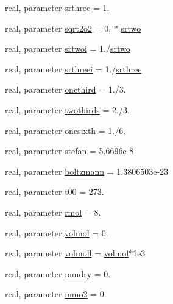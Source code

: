 \begin{DoxyCompactItemize}
\item 
real, parameter \hyperlink{namespaceconsts__coms_a17913c8f0ccea4623bad63371995c51f}{srthree} = 1.
\item 
real, parameter \hyperlink{namespaceconsts__coms_a21cd110a4618508e5aabb43b56aa56d6}{sqrt2o2} = 0. $\ast$ \hyperlink{namespaceconsts__coms_ad2093037aef885081f727f22fe6b2554}{srtwo}
\item 
real, parameter \hyperlink{namespaceconsts__coms_a1dbb872d0aae3243d72b9c43864ec88f}{srtwoi} = 1./\hyperlink{namespaceconsts__coms_ad2093037aef885081f727f22fe6b2554}{srtwo}
\item 
real, parameter \hyperlink{namespaceconsts__coms_a448722d61ca70f7d3d572048be47c1e5}{srthreei} = 1./\hyperlink{namespaceconsts__coms_a17913c8f0ccea4623bad63371995c51f}{srthree}
\item 
real, parameter \hyperlink{namespaceconsts__coms_a77951232affbc4dc54bd20a0dfe1244f}{onethird} = 1./3.
\item 
real, parameter \hyperlink{namespaceconsts__coms_a7ac856e6d8ab0454fcd39dce6cd2ea71}{twothirds} = 2./3.
\item 
real, parameter \hyperlink{namespaceconsts__coms_ada6e5b6811f533bff45549fe556966ee}{onesixth} = 1./6.
\item 
real, parameter \hyperlink{namespaceconsts__coms_af216e24a2bb718d85f4e5501f586634e}{stefan} = 5.\+6696e-\/8
\item 
real, parameter \hyperlink{namespaceconsts__coms_afc5519d22399e9054c914e08f4b03bc5}{boltzmann} = 1.\+3806503e-\/23
\item 
real, parameter \hyperlink{namespaceconsts__coms_afbc98a1338166b05d3a2d997c7b27259}{t00} = 273.
\item 
real, parameter \hyperlink{namespaceconsts__coms_ada5d8a1334128cdd95a8a4e15c149599}{rmol} = 8.
\item 
real, parameter \hyperlink{namespaceconsts__coms_a2c08b6494703da0637aaf244befddfe2}{volmol} = 0.
\item 
real, parameter \hyperlink{namespaceconsts__coms_a8931f8cd781a8b09d11212c651fec485}{volmoll} = \hyperlink{namespaceconsts__coms_a2c08b6494703da0637aaf244befddfe2}{volmol}$\ast$1e3
\item 
real, parameter \hyperlink{namespaceconsts__coms_a7aa35c23be3fddc9db2686245d45cda1}{mmdry} = 0.
\item 
real, parameter \hyperlink{namespaceconsts__coms_a5f6f1ee45767d7fcd7c397df0631feab}{mmo2} = 0.
\item 

\end{DoxyCompactItemize}
